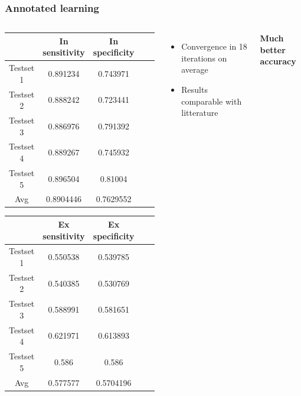 \documentclass{beamer}
\begin{document}
\begin{frame}
\frametitle{Annotated learning}
\begin{columns}

		\begin{scriptsize}
		\begin{table}[h!]
		
		\begin{tabular}{|c|c|c|c|c|}
		
			\hline
				&In sensitivity	& In specificity\\	
			\hline
				Testset 1	& 0.891234	& 0.743971\\
			\hline
				Testset 2	& 0.888242	& 0.723441\\
			\hline
				Testset 3	& 0.886976	& 0.791392\\
			\hline
				Testset 4	& 0.889267	& 0.745932\\
			\hline
				Testset 5	& 0.896504	& 0.81004\\
			\hline
				Avg		& 0.8904446	& 0.7629552\\
			\hline	
			
					
		\end{tabular}
	
		\vspace{0.5 cm}
		
		\begin{tabular}{|c|c|c|c|c|}
		
			\hline
				& Ex sensitivity	& Ex specificity\\
			\hline
				Testset 1 & 0.550538	& 0.539785\\
			\hline
				Testset 2	& 0.540385	& 0.530769	\\
			\hline
				Testset 3	& 0.588991	& 0.581651\\
			\hline
				Testset 4	& 0.621971	& 0.613893\\
			\hline
				Testset 5	& 0.586		& 0.586\\
			\hline
				Avg		& 0.577577	& 0.5704196\\
			\hline	
			
					
		\end{tabular}
		
		\end{table}
		
		\end{scriptsize}
		
		
		\begin{itemize}
			\item Convergence in 18 iterations on average
			\item Results comparable with litterature
		 \end{itemize}
		 
		 \vspace{0.5 cm}
		 
		 \centering\textbf{Much better accuracy}
\end{columns}
\end{frame}
\end{document}
